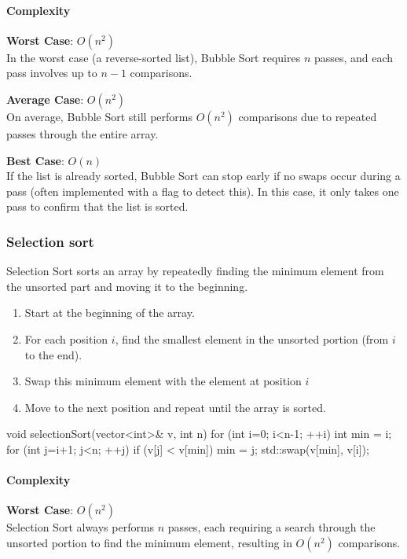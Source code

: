 \documentclass{report}
\begin{document}
\paragraph{Complexity}
\bigbreak \noindent \bigbreak \noindent 
\textbf{Worst Case}: \( O(n^2) \) \\
\bigbreak \noindent 
In the worst case (a reverse-sorted list), Bubble Sort requires \( n \) passes, and each pass involves up to \( n - 1 \) comparisons.

\bigbreak \noindent 
\textbf{Average Case}: \( O(n^2) \) \\
\bigbreak \noindent 
On average, Bubble Sort still performs \( O(n^2) \) comparisons due to repeated passes through the entire array.

\bigbreak \noindent 
\textbf{Best Case}: \( O(n) \) \\
\bigbreak \noindent 
If the list is already sorted, Bubble Sort can stop early if no swaps occur during a pass (often implemented with a flag to detect this). In this case, it only takes one pass to confirm that the list is sorted.

\pagebreak 
\subsubsection{Selection sort}
\bigbreak \noindent 
Selection Sort sorts an array by repeatedly finding the minimum element from the unsorted part and moving it to the beginning.
\begin{enumerate}
    \item Start at the beginning of the array.
    \item For each position $i$, find the smallest element in the unsorted portion (from $i$ to the end).
    \item Swap this minimum element with the element at position $i$
    \item Move to the next position and repeat until the array is sorted.
\end{enumerate}
\bigbreak \noindent 
\begin{cppcode}
    void selectionSort(vector<int>& v, int n) {
        for (int i=0; i<n-1; ++i) {
            int min = i;
            for (int j=i+1; j<n; ++j) {
                if (v[j] < v[min]) {
                    min = j;
                }
            }
            std::swap(v[min], v[i]);
        }
    }
\end{cppcode}
\bigbreak \noindent 
\paragraph{Complexity}
\bigbreak \noindent \bigbreak \noindent 
\textbf{Worst Case}: \( O(n^2) \) \\
\bigbreak \noindent 
Selection Sort always performs \( n \) passes, each requiring a search through the unsorted portion to find the minimum element, resulting in \( O(n^2) \) comparisons.
\end{document}

